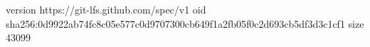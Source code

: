 version https://git-lfs.github.com/spec/v1
oid sha256:0d9922ab74fc8c05e577c0d9707300cb649f1a2fb05f0c2d693cb5df3d3c1cf1
size 43099
